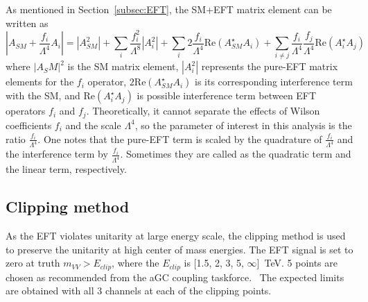 
As mentioned in Section~\ref{subsec:EFT}, the SM+EFT matrix element can be written as
\begin{equation}
   |A_{SM}+\frac{f_i}{\Lambda^4}A_i|=|A_{SM}^2|+\sum\limits_i \frac{f_i^2}{\Lambda^8}|A_{i}^2|+ \sum\limits_i 2 \frac{f_i}{\Lambda^4} \mathrm{Re}(A_{SM}^\star A_i) +\sum\limits_{i\neq j} \frac{f_i}{\Lambda^4} \frac{f_j}{\Lambda^4} \mathrm{Re}(A_i^\star A_j)
\end{equation}
where $|A_SM|^2$ is the SM matrix element, $|A_{i}^2|$ represents the pure-EFT matrix elements for the $f_{i}$ operator, $2 \mathrm{Re}(A_{SM}^\star A_i)$ is its corresponding interference term with the SM, and $\mathrm{Re}(A_i^\star A_j)$ is possible interference term between EFT operators $f_{i}$ and $f_{j}$. 
Theoretically, it cannot separate the effects of Wilson coefficients $f_i$ and the scale $\Lambda^4$, so the parameter of interest in this analysis is the ratio $\frac{f_i}{\Lambda^4}$. %
One notes that the pure-EFT term is scaled by the quadrature of $\frac{f_i}{\Lambda^4}$ and the interference term by $\frac{f_{i}}{\Lambda^4}$.
Sometimes they are called as the quadratic term and the linear term, respectively.


\subsection{Clipping method}
\label{subsec:clipping}
As the EFT violates unitarity at large energy scale, the clipping method is used to preserve the unitarity at high center of mass energies. 
The EFT signal is set to zero at truth $m_{VV} > E_{clip}$, where the $E_{clip}$ is [1.5, 2, 3, 5, $\infty$]~TeV. 
5 points are chosen as recommended from the aGC coupling taskforce.~\cite{ATL-COM-PHYS-2017-433} 
The expected limits are obtained with all 3 channels at each of the clipping points.

